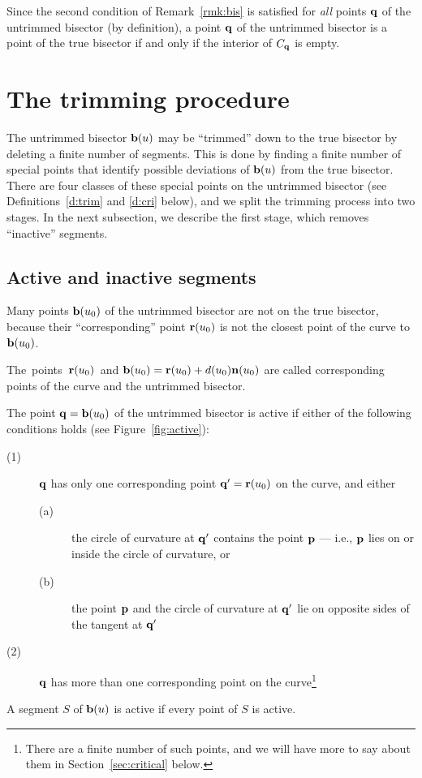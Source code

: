 Since the second condition of Remark~\ref{rmk:bis} is satisfied for
{\it all\/} points ${\bf q}$ of the untrimmed bisector (by definition),
a point ${\bf q}$ of the untrimmed bisector is a point of the true
bisector if and only if the interior of $C_{\bf q}$ is empty.

\section{The trimming procedure}
\label{trimming}

The untrimmed bisector ${\bf b}(u)$ may be ``trimmed'' down to the true
bisector by deleting a finite number of segments. 
This is done by finding a finite number of special points that
identify possible deviations of ${\bf b}(u)$ from the true bisector.
There are four classes of these special points on the untrimmed bisector
(see Definitions~\ref{d:trim} and \ref{d:cri} below), and we split the trimming
process into two stages. 
In the next subsection, we describe the first stage, which removes
``inactive'' segments.

\subsection{Active and inactive segments}

Many points ${\bf b}(u_0)$ of the untrimmed bisector are not on the 
true bisector, because their ``corresponding'' point ${\bf r}(u_0)$ is not 
the closest point of the curve to ${\bf b}(u_0)$.

\begin{dfn}
The~points~${\bf r}(u_0)$~and ${\bf b}(u_0)={\bf r}(u_0)+d(u_0){\bf n}
(u_0)$ are called {\rm corresponding} points of the curve and the
untrimmed bisector.
\end{dfn}

\begin{dfn}
The point ${\bf q} = {\bf b}(u_{0})$ of the untrimmed bisector is
{\rm active} if either of the following conditions holds 
(see Figure~\ref{fig:active}):
\begin{description}
\item[{\rm (1)}]
        ${\bf q}$ has only one corresponding point ${\bf q}' =
        {\bf r}(u_0)$ on the curve, and either
\begin{description}
\item[{\rm (a)}]
        the circle of curvature at ${\bf q}'$ contains the point ${\bf p}$
        --- i.e., ${\bf p}$ lies on or inside the circle of curvature, or
\item[{\rm (b)}]
        the point ${\bf p}$ and the circle of curvature at ${\bf q}'$
        lie on opposite sides of the tangent at ${\bf q'}$
\end{description}
\item[{\rm (2)}]
        ${\bf q}$ has more than one corresponding point on the
        curve\footnote{There are a finite number of such points, and
        we will have more to say about them in Section~\ref{sec:critical} 
	below.}
\end{description}
A segment $S$ of ${\bf b}(u)$ is active
if every point of $S$ is active.
\end{dfn}

